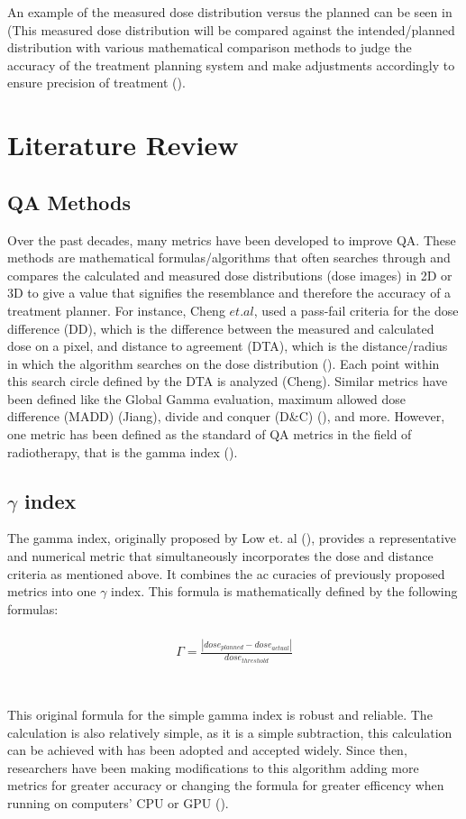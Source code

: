 \documentclass[12pt]{article}
\begin{document}
An example of the measured dose distribution versus the planned can be seen in (This measured dose distribution will be compared against the intended/planned distribution with various mathematical comparison methods to judge the accuracy of the treatment planning system and make adjustments accordingly to ensure precision of treatment (\textcite{Low}).

\section{Literature Review}
\subsection{QA Methods}
Over the past decades, many metrics have been developed to improve QA. These methods are mathematical formulas/algorithms that often searches through and compares the calculated and measured dose distributions (dose images) in 2D or 3D to give a value that signifies the resemblance and therefore the accuracy of a treatment planner. For instance, Cheng $et. al$, used a pass-fail criteria for the dose difference (DD), which is the difference between the measured and calculated dose on a pixel, and distance to agreement (DTA), which is the distance/radius in which the algorithm searches on the dose distribution (\textcite{Cheng}). Each point within this search circle defined by the DTA is analyzed (Cheng). Similar metrics have been defined like the Global Gamma evaluation, maximum allowed dose difference (MADD) (Jiang), divide and conquer (D\&C) (\textcite{Stojadinovic}), and more. However, one metric has been defined as the standard of QA metrics in the field of radiotherapy, that is the gamma index (\textcite{Low}).

\subsection{$\gamma$ index}
The gamma index, originally proposed by Low et. al (\textcite{Low}), provides a representative and numerical metric that simultaneously incorporates the dose and distance criteria as mentioned above. It combines the ac curacies of previously proposed metrics into one $\gamma$ index. This formula is mathematically defined by the following formulas:
\\
\\
\begin{align}
  \Gamma = \frac{|dose_{planned} - dose_{actual}|}{dose_{threshold}} \\
\end{align}
\\
\\
This original formula for the simple gamma index is robust and reliable. The calculation is also relatively simple, as it is a simple subtraction, this calculation can be achieved with has been adopted and accepted widely. Since then, researchers have been making modifications to this algorithm adding more metrics for greater accuracy or changing the formula for greater efficency when running on computers' CPU or GPU (\textcite{Gu}).
\end{document}
